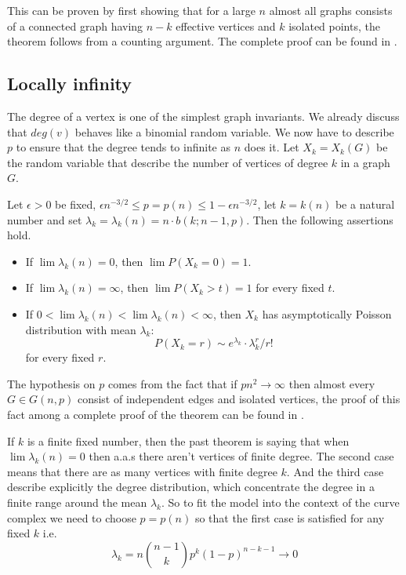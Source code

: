  This can be proven by first showing that for a large $n$ almost all graphs consists of a connected graph having $n-k$ effective vertices and $k$ isolated points, the theorem follows from a counting argument. The complete proof can be found in \cite[Erdös-Rényi, 59]{OnRandomGraphs}.
 
 
\subsection{Locally infinity}
The degree of a vertex is one of the simplest graph invariants. We already discuss that $deg(v)$ behaves like a binomial random variable. We now have to describe $p$ to ensure that the degree tends to infinite as $n$ does it. Let $X_{k} = X_{k} (G)$ be the random variable that describe the number of vertices of degree $k$ in a graph $G$.

\begin{theorem}
Let $\epsilon>0$ be fixed, $\epsilon n^{-3/2} \leq p = p(n) \leq 1 - \epsilon n^{-3/2}$, let $k = k(n)$ be a natural number and set $\lambda_{k} = \lambda_{k}(n) = n\cdot b(k;n - 1,p)$. Then the following assertions hold.

\begin{itemize}
\item If $\lim \lambda_{k}(n) = 0$, then $\lim P(X_{k} = 0) = 1$. 
\item If $\lim \lambda_{k}(n) = \infty$, then $\lim P(X_{k} > t) = 1$
for every fixed $t$.
\item If $0 < \lim\lambda_{k}(n) < \lim \lambda_{k}(n) < \infty$,
then $X_{k}$ has asymptotically Poisson distribution with mean $\lambda_{k}$: 
$$P(X_{k} = r) \sim e^{\lambda_{k}}\cdot \lambda_{k}^{r}/ r!$$
for every fixed $r$.
\end{itemize}
\end{theorem}

The hypothesis on $p$ comes from the fact that if $pn^{2}\to \infty$ then almost every $G\in G(n,p)$ consist of independent edges and isolated vertices, the proof of this fact among a complete proof of the theorem can be found in \cite[Bollobás, p.61]{Bollobas}.

If $k$ is a finite fixed number, then the past theorem is saying that when $\lim \lambda_{k}(n) = 0$ then a.a.s there aren't vertices of finite degree. The second case means that there are as many vertices with finite degree $k$. And the third case describe explicitly the degree distribution, which concentrate the degree in a finite range around the mean $\lambda_{k}$. So to fit the model into the context of the curve complex we need to choose $p = p(n)$ so that the first case is satisfied for any fixed $k$ i.e.
$$\lambda_{k} = n \binom{n-1}{k} p^{k} (1-p)^{n-k-1} \to 0$$



